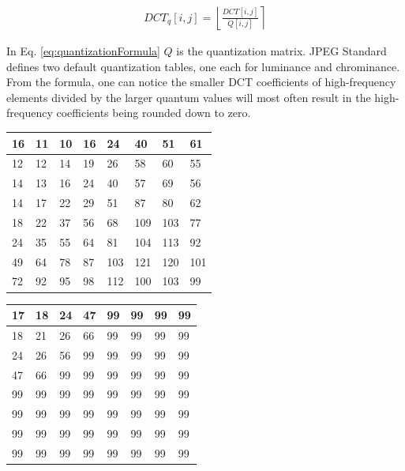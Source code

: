 \begin{equation}
    \begin{split}
        DCT_q[i,j] = \left \lfloor \frac{DCT[i,j]}{Q[i,j]} \right \rceil
    \end{split}
    \label{eq:quantizationFormula}
\end{equation}

In Eq. \ref{eq:quantizationFormula} $Q$ is the quantization matrix. JPEG Standard defines two default quantization tables, one each for luminance and chrominance. From the formula, one can notice the smaller DCT coefficients of high-frequency elements divided by the larger quantum values will most often result in the high-frequency coefficients being rounded down to zero.

\begingroup
\centering
    \begin{tabular}{|l|l|l|l|l|l|l|l|}
    \hline
    16 & 11 & 10 & 16 & 24  & 40  & 51  & 61  \\ \hline
    12 & 12 & 14 & 19 & 26  & 58  & 60  & 55  \\ \hline
    14 & 13 & 16 & 24 & 40  & 57  & 69  & 56  \\ \hline
    14 & 17 & 22 & 29 & 51  & 87  & 80  & 62  \\ \hline
    18 & 22 & 37 & 56 & 68  & 109 & 103 & 77  \\ \hline
    24 & 35 & 55 & 64 & 81  & 104 & 113 & 92  \\ \hline
    49 & 64 & 78 & 87 & 103 & 121 & 120 & 101 \\ \hline
    72 & 92 & 95 & 98 & 112 & 100 & 103 & 99  \\ \hline
    \end{tabular}
    \label{tbl:LuminanceQuantTable}
\endgroup

\vspace{2em}

\begingroup
\centering
    \begin{tabular}{|l|l|l|l|l|l|l|l|}
    \hline
    17 & 18 & 24 & 47 & 99 & 99 & 99 & 99 \\ \hline
    18 & 21 & 26 & 66 & 99 & 99 & 99 & 99 \\ \hline
    24 & 26 & 56 & 99 & 99 & 99 & 99 & 99 \\ \hline
    47 & 66 & 99 & 99 & 99 & 99 & 99 & 99 \\ \hline
    99 & 99 & 99 & 99 & 99 & 99 & 99 & 99 \\ \hline
    99 & 99 & 99 & 99 & 99 & 99 & 99 & 99 \\ \hline
    99 & 99 & 99 & 99 & 99 & 99 & 99 & 99 \\ \hline
    99 & 99 & 99 & 99 & 99 & 99 & 99 & 99 \\ \hline
    \end{tabular}
    \label{tbl:ChrominanceQuantTable}
\endgroup

